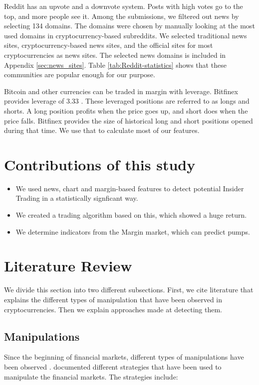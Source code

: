 \documentclass[letterpaper]{article}
\begin{document}
Reddit has an upvote and a downvote system. Posts 
with high votes go to the top, and more people see it. Among the submissions, we filtered out news 
by selecting 134 domains. The domains were chosen by manually looking at the 
most used domains in cryptocurrency-based subreddits. We selected traditional news sites, cryptocurrency-based news sites, and the official sites for most cryptocurrencies as news sites. The selected news domains 
is included in Appendix \ref{sec:news_sites}.
Table \ref{tab:Reddit-statistics} shows that these communities are popular enough for our 
purpose. \par

Bitcoin and other currencies can be traded in margin with leverage. Bitfinex provides leverage of 3.33 
\cite{Bitfinex}. These leveraged positions are referred to as longs and shorts. A long position profits when 
the price goes up, and short does when the price falls. Bitfinex provides the size of historical long and 
short positions opened during that time. We use that to calculate most of our features. \par

\section{Contributions of this study}
\label{sec:contributions}
\begin{itemize}
    \item We used news, chart and margin-based features to detect potential Insider Trading in a statistically signficant 
    way.
    \item We created a trading algorithm based on this, which showed a huge return. 
    \item We determine indicators from the Margin market, which can predict pumps.
\end{itemize}

\section{Literature Review}
\label{sec:literature_review}
We divide this section into two different subsections. First, we cite literature that explains the different types of 
manipulation that have been observed in cryptocurrencies. Then we explain approaches made at detecting them.

\subsection{Manipulations}
\label{sec:manipulations}
Since the beginning of financial markets, different types of manipulations have been observed 
\cite{markham2015law}. \cite{lin2016new} documented different strategies that have been used 
to manipulate the financial markets. The strategies include:
\end{document}
